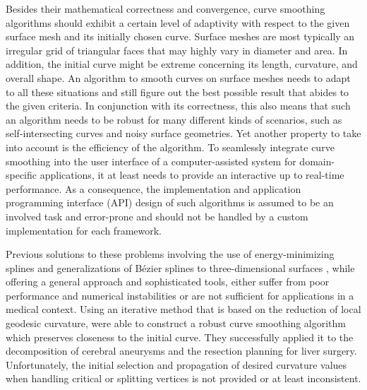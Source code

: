 \documentclass{stdlocal}
\begin{document}
Besides their mathematical correctness and convergence, curve smoothing algorithms should exhibit a certain level of adaptivity with respect to the given surface mesh and its initially chosen curve.
Surface meshes are most typically an irregular grid of triangular faces that may highly vary in diameter and area.
In addition, the initial curve might be extreme concerning its length, curvature, and overall shape.
An algorithm to smooth curves on surface meshes needs to adapt to all these situations and still figure out the best possible result that abides to the given criteria.
In conjunction with its correctness, this also means that such an algorithm needs to be robust for many different kinds of scenarios, such as self-intersecting curves and noisy surface geometries.
Yet another property to take into account is the efficiency of the algorithm.
To seamlessly integrate curve smoothing into the user interface of a computer-assisted system for domain-specific applications, it at least needs to provide an interactive up to real-time performance.
As a consequence, the implementation and application programming interface (API) design of such algorithms is assumed to be an involved task and error-prone and should not be handled by a custom implementation for each framework. \\
\autocite{lawonn2014}

Previous solutions to these problems involving the use of energy-minimizing splines \autocite{hofer2004} and generalizations of Bézier splines to three-dimensional surfaces \autocite{martinez2007,mancinelli2022}, while offering a general approach and sophisticated tools, either suffer from poor performance and numerical instabilities or are not sufficient for applications in a medical context.
Using an iterative method that is based on the reduction of local geodesic curvature, \textcite{lawonn2014} were able to construct a robust curve smoothing algorithm which preserves closeness to the initial curve.
They successfully applied it to the decomposition of cerebral aneurysms and the resection planning for liver surgery.
Unfortunately, the initial selection and propagation of desired curvature values when handling critical or splitting vertices is not provided or at least inconsistent.
\end{document}
